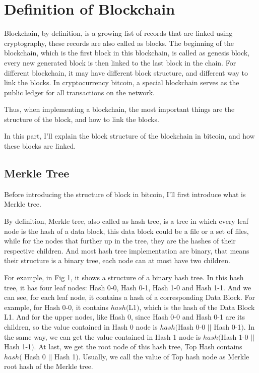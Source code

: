 \documentclass[12pt,a4paper]{article}
\begin{document}
\section{Definition of Blockchain}\label{def}
Blockchain, by definition, is a growing list of records that are linked using cryptography, these records are also called as blocks. The beginning of the blockchain, which is the first block in this blockchain, is called as genesis block, every new generated block is then linked to the last block in the chain. For different blockchain, it may have different block structure, and different way to link the blocks. In cryptocurrency bitcoin, a special blockchain serves as the public ledger for all transactions on the network. 

Thus, when implementing a blockchain, the most important things are the structure of the block, and how to link the blocks.

In this part, I'll explain the block structure of the blockchain in bitcoin, and how these blocks are linked.

\subsection{Merkle Tree}

Before introducing the structure of block in bitcoin, I'll first introduce what is Merkle tree.

By definition, Merkle tree, also called as hash tree, is a tree in which every leaf node is the hash of a data block, this data block could be a file or a set of files, while for the nodes that further up in the tree, they are the hashes of their respective children. And most hash tree implementation are binary, that means their structure is a binary tree, each node can at most have two children.

For example, in Fig 1, it shows a structure of a binary hash tree. In this hash tree, it has four leaf nodes: Hash 0-0, Hash 0-1, Hash 1-0 and Hash 1-1. And we can see, for each leaf node, it contains a hash of a corresponding Data Block. For example, for Hash 0-0, it contains $hash($L1$)$, which is the hash of the Data Block L1. And for the upper nodes, like Hash 0, since Hash 0-0 and Hash 0-1 are its children, so the value contained in Hash 0 node is $hash($Hash 0-0 $||$ Hash 0-1$)$. In the same way, we can get the value contained in Hash 1 node is $hash($Hash 1-0 $||$ Hash 1-1$)$. At last, we get the root node of this hash tree, Top Hash contains $hash($ Hash 0 $||$ Hash 1$)$. Usually, we call the value of Top hash node as Merkle root hash of the Merkle tree.
\end{document}
